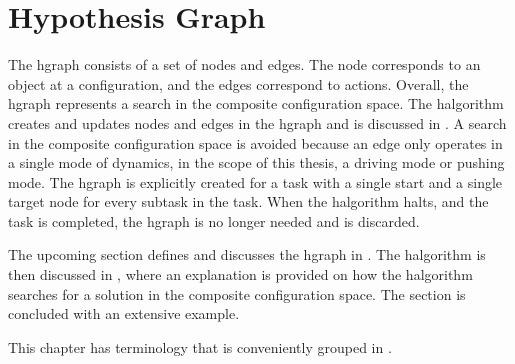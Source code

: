 \section{Hypothesis Graph}%
\label{sec:hgraph}
The \acf{hgraph} consists of a set of nodes and edges. The node corresponds to an object at a configuration, and the edges correspond to actions. Overall, the \ac{hgraph} represents a search in the composite configuration space. The \ac{halgorithm} creates and updates nodes and edges in the \ac{hgraph} and is discussed in . A search in the composite configuration space is avoided because an edge only operates in a single mode of dynamics, in the scope of this thesis, a driving mode or pushing mode. The \ac{hgraph} is explicitly created for a task with a single start and a single target node for every subtask in the task. When the \ac{halgorithm} halts, and the task is completed, the \ac{hgraph} is no longer needed and is discarded.\bs

The upcoming section defines and discusses the \ac{hgraph} in . The \ac{halgorithm} is then discussed in , where an explanation is provided on how the \ac{halgorithm} searches for a solution in the composite configuration space. The section is concluded with an extensive example.\bs




This chapter has terminology that is conveniently grouped in .\bs

